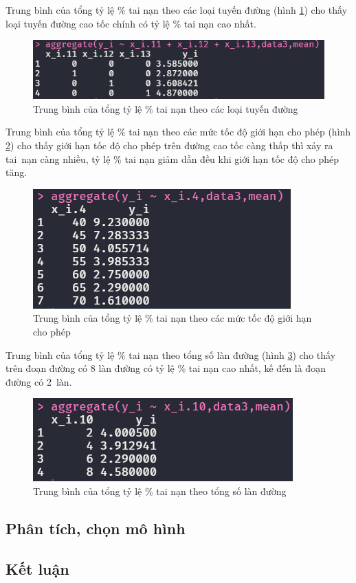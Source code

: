 Trung bình của tổng tỷ lệ \% tai nạn theo các loại tuyến đường (hình \ref{fig-b3:aggregate-x11-13}) cho thấy loại tuyến đường cao tốc chính có tỷ lệ \% tai nạn cao nhất.
\begin{figure}[H]
	\centering
	\includegraphics[width=0.7\linewidth]{images/B3/aggregate-x11-13}
	\caption{Trung bình của tổng tỷ lệ \% tai nạn theo các loại tuyến đường}
	\label{fig-b3:aggregate-x11-13}
\end{figure}

Trung bình của tổng tỷ lệ \% tai nạn theo các mức tốc độ giới hạn cho phép (hình \ref{fig-b3:aggregate-x4}) cho thấy giới hạn tốc độ cho phép trên đường cao tốc càng thấp thì xảy ra tai~nạn càng nhiều, tỷ lệ \% tai nạn giảm dần đều khi giới hạn tốc độ cho phép tăng.
\begin{figure}[H]
	\centering
	\includegraphics[width=0.45\linewidth]{images/B3/aggregate-x4}
	\caption{Trung bình của tổng tỷ lệ \% tai nạn theo các mức tốc độ giới hạn cho phép}
	\label{fig-b3:aggregate-x4}
\end{figure}

Trung bình của tổng tỷ lệ \% tai nạn theo tổng số làn đường (hình \ref{fig-b3:aggregate-x10}) cho thấy  trên đoạn đường có 8 làn đường có tỷ lệ \% tai nạn cao nhất, kế đến là đoạn đường có 2~làn.
\begin{figure}[H]
	\centering
	\includegraphics[width=0.45\linewidth]{images/B3/aggregate-x10}
	\caption{Trung bình của tổng tỷ lệ \% tai nạn theo tổng số làn đường}
	\label{fig-b3:aggregate-x10}
\end{figure}




\subsection*{Phân tích, chọn mô hình}
\subsection*{Kết luận}